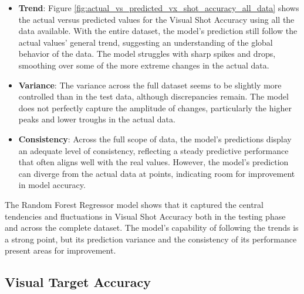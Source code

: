 \begin{itemize}
    \item \textbf{Trend}: Figure \ref{fig:actual_vs_predicted_vx_shot_accuracy_all_data} shows the actual versus predicted values for the Visual Shot Accuracy using all the data available.  
    With the entire dataset, the model's prediction still follow the actual values' general trend, suggesting an understanding of the global behavior of the data. The model struggles
    with sharp spikes and drops, smoothing over some of the more extreme changes in the actual data. 
    
    \item \textbf{Variance}: The variance across the full dataset seems to be slightly more controlled than in the test data, although discrepancies remain. The model does not perfectly capture
    the amplitude of changes, particularly the higher peaks and lower troughs in the actual data.
    
    \item \textbf{Consistency}: Across the full scope of data, the model's predictions display an adequate level of consistency, reflecting a steady predictive performance that often aligns well with the real values.
    However, the model's prediction can diverge from the actual data at points, indicating room for improvement in model accuracy.
    
\end{itemize}

The Random Forest Regressor model shows that it captured the central tendencies and fluctuations in Visual Shot Accuracy both in the testing phase and across the complete dataset. The model's capability of 
following the trends is a strong point, but its prediction variance and the consistency of its performance present areas for improvement. 


\subsection*{Visual Target Accuracy}

